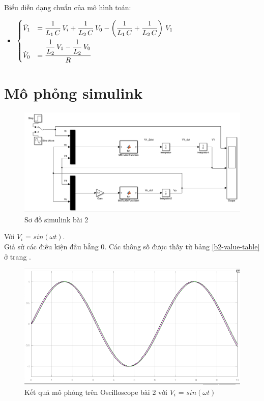 \documentclass{standalone}
\begin{document}
	Biểu diễn dạng chuẩn của mô hình toán:

	\begin{itemize}
		\item [] $	
		\begin{dcases}
			\ddot V_1 &= \dfrac{1}{L_1\,C}\,V_i + \dfrac{1}{L_2\,C}\,V_0 - \left(\dfrac{1}{L_1\,C} + \dfrac{1}{L_2\,C}\right)\,V_1\\
			\dot V_0 &= \dfrac{\dfrac{1}{L_2}\,V_1 - \dfrac{1}{L_2}\,V_0}{R}
		\end{dcases}
		$
	\end{itemize}

	
	\section{Mô phỏng simulink}%
	\begin{figure}[!htp]
		\centering
		\includegraphics[scale=0.4]{images/b2-simu}
		\caption{Sơ đồ simulink bài 2}
		\label{b2-simu}
	\end{figure}
	\pagebreak
	
	Với $V_i$ = $sin(\omega t)$.\\
	Giả sử các điều kiện đầu bằng 0. Các thông số được thấy từ bảng \ref{b2-value-table} ở trang \pageref{b2-value-table}.\\

	\begin{figure}[!htp]
		\centering
		\includegraphics[scale=0.5]{images/b2-scop-sine}
		\caption{Kết quả mô phỏng trên Oscilloscope bài 2 với $V_i$ = $sin(\omega t)$ }
		\label{b2-scop-sine}
	\end{figure}
	
\end{document}
